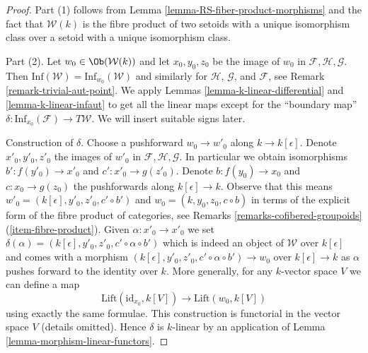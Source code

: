 \begin{proof}
Part (1) follows from Lemma \ref{lemma-RS-fiber-product-morphisms}
and the fact that $\mathcal{W}(k)$ is the fibre product of
two setoids with a unique isomorphism class over a setoid with
a unique isomorphism class.

\medskip\noindent
Part (2). Let $w_0 \in \Ob(\mathcal{W}(k))$ and let $x_0, y_0, z_0$ be
the image of $w_0$ in $\mathcal{F}, \mathcal{H}, \mathcal{G}$.
Then $\text{Inf}(\mathcal{W}) = \text{Inf}_{w_0}(\mathcal{W})$
and similarly for $\mathcal{H}$, $\mathcal{G}$, and $\mathcal{F}$, see
Remark \ref{remark-trivial-aut-point}.
We apply Lemmas \ref{lemma-k-linear-differential} and
\ref{lemma-k-linear-infaut} to get all the linear maps
except for the ``boundary map''
$\delta : \text{Inf}_{x_0}(\mathcal{F}) \to T\mathcal{W}$.
We will insert suitable signs later.

\medskip\noindent
Construction of $\delta$. Choose a pushforward $w_0 \to w'_0$ along
$k \to k[\epsilon]$. Denote $x'_0, y'_0, z'_0$ the images of $w'_0$ in
$\mathcal{F}, \mathcal{H}, \mathcal{G}$. In particular
we obtain isomorphisms $b' : f(y'_0) \to x'_0$ and $c' : x'_0 \to g(z'_0)$.
Denote $b : f(y_0) \to x_0$ and $c : x_0 \to g(z_0)$ the pushforwards
along $k[\epsilon] \to k$. Observe that this means
$w'_0 = (k[\epsilon], y'_0, z'_0, c' \circ b')$ and
$w_0 = (k, y_0, z_0, c \circ b)$ in terms of the explicit form
of the fibre product of categories,
see Remarks \ref{remarks-cofibered-groupoids} (\ref{item-fibre-product}).
Given $\alpha : x'_0 \to x'_0$ we set
$\delta(\alpha) = (k[\epsilon], y'_0, z'_0, c' \circ \alpha \circ b')$
which is indeed an object of $\mathcal{W}$ over $k[\epsilon]$ and comes
with a morphism $(k[\epsilon], y'_0, z'_0, c' \circ \alpha \circ b') \to w_0$
over $k[\epsilon] \to k$ as $\alpha$ pushes forward to the identity over $k$.
More generally, for any $k$-vector space $V$ we can define a map
$$
\text{Lift}(\text{id}_{x_0}, k[V])
\longrightarrow
\text{Lift}(w_0, k[V])
$$
using exactly the same formulae. This construction is functorial
in the vector space $V$ (details omitted). Hence $\delta$ is $k$-linear
by an application of
Lemma \ref{lemma-morphism-linear-functors}.


\end{proof}
